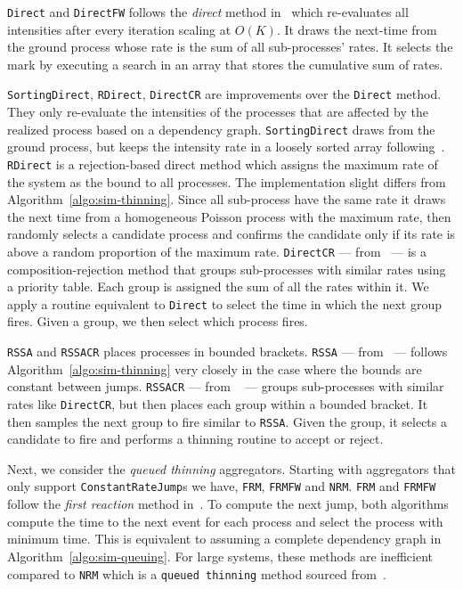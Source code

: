 \documentclass{juliacon}
\numberwithin{equation}{section}
\begin{document}
\texttt{Direct} and \texttt{DirectFW} follows the \textit{direct} method in~\cite{gillespie1976} which re-evaluates all intensities after every iteration scaling at \( O(K) \). It draws the next-time from the ground process whose rate is the sum of all sub-processes' rates. It selects the mark by executing a search in an array that stores the cumulative sum of rates. 

\texttt{SortingDirect}, \texttt{RDirect}, \texttt{DirectCR} are improvements over the \texttt{Direct} method. They only re-evaluate the intensities of the processes that are affected by the realized process based on a dependency graph. \texttt{SortingDirect} draws from the ground process, but keeps the intensity rate in a loosely sorted array following~\cite{mccollum2006}. \texttt{RDirect} is a rejection-based direct method which assigns the maximum rate of the system as the bound to all processes. The implementation slight differs from Algorithm~\ref{algo:sim-thinning}. Since all sub-process have the same rate it draws the next time from a homogeneous Poisson process with the maximum rate, then randomly selects a candidate process and confirms the candidate only if its rate is above a random proportion of the maximum rate. \texttt{DirectCR} --- from~\cite{slepoy2008} --- is a composition-rejection method that groups sub-processes with similar rates using a priority table. Each group is assigned the sum of all the rates within it. We apply a routine equivalent to \texttt{Direct} to select the time in which the next group fires. Given a group, we then select which process fires.

\texttt{RSSA} and \texttt{RSSACR} places processes in bounded brackets. \texttt{RSSA} --- from~\cite{thanh2014} --- follows Algorithm~\ref{algo:sim-thinning} very closely in the case where the bounds are constant between jumps. \texttt{RSSACR} --- from ~\cite{thanh2017} --- groups sub-processes with similar rates like \texttt{DirectCR}, but then places each group within a bounded bracket. It then samples the next group to fire similar to \texttt{RSSA}. Given the group, it selects a candidate to fire and performs a thinning routine to accept or reject.

Next, we consider the \textit{queued thinning} aggregators. Starting with aggregators that only support \texttt{ConstantRateJump}s we have, \texttt{FRM}, \texttt{FRMFW} and \texttt{NRM}. \texttt{FRM} and \texttt{FRMFW} follow the \textit{first reaction} method in~\cite{gillespie1976}. To compute the next jump, both algorithms compute the time to the next event for each process and select the process with minimum time. This is equivalent to assuming a complete dependency graph in Algorithm~\ref{algo:sim-queuing}. For large systems, these methods are inefficient compared to \texttt{NRM} which is a \texttt{queued thinning} method sourced from~\cite{gibson2000}.
\end{document}
